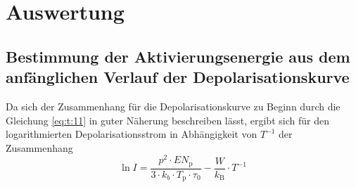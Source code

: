 \newpage
\section{Auswertung}
\label{sec:Auswertung}

\subsection{Bestimmung der Aktivierungsenergie aus dem anfänglichen Verlauf der Depolarisationskurve}
\label{subsec:method1}
Da sich der Zusammenhang für die Depolarisationskurve zu Beginn durch die Gleichung \eqref{eq:t:11} in guter Näherung
beschreiben lässt, ergibt sich für den logarithmierten Depolarisationsstrom in Abhängigkeit von $T^{-1}$ der Zusammenhang
\\
\begin{equation}
  \label{eqn:lineardepolar}
  \ln{I} = \frac{p^2 \cdot E N_\text{p} }{3 \cdot k_{b}
   \cdot T_\text{p} \cdot \tau_{0}} -\frac{W}{k_{\text{B}}} \cdot T^{-1}
\end{equation}

